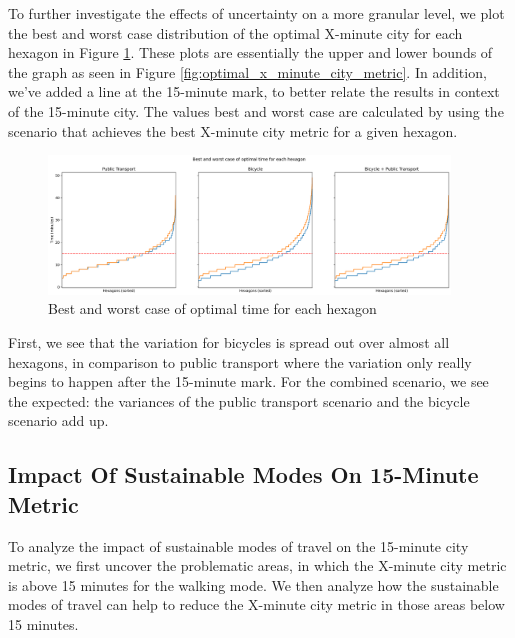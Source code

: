 To further investigate the effects of uncertainty on a more granular level, we plot the best and worst case distribution of the optimal X-minute city for each hexagon in Figure \ref{fig:best_and_worst_case_of_optimal_time_for_each_hexagon}.
These plots are essentially the upper and lower bounds of the graph as seen in Figure \ref{fig:optimal_x_minute_city_metric}.
In addition, we've added a line at the 15-minute mark, to better relate the results in context of the 15-minute city.
The values best and worst case are calculated by using the scenario that achieves the best X-minute city metric for a given hexagon.
\begin{figure}
  \begin{center}
    \includegraphics[width=0.95\textwidth]{Figures/results/uncertainty/optimal_best_worst_case}
  \end{center}
  \caption{Best and worst case of optimal time for each hexagon}
  \label{fig:best_and_worst_case_of_optimal_time_for_each_hexagon}
\end{figure}
First, we see that the variation for bicycles is spread out over almost all hexagons, in comparison to public transport where the variation only really begins to happen after the 15-minute mark.
For the combined scenario, we see the expected: the variances of the public transport scenario and the bicycle scenario add up.

\subsection{Impact Of Sustainable Modes On 15-Minute Metric}
\label{subsec:impact_of_sustainable_modes_on_15_minute_metric}

To analyze the impact of sustainable modes of travel on the 15-minute city metric, we first uncover the problematic areas, in which the X-minute city metric is above 15 minutes for the walking mode.
We then analyze how the sustainable modes of travel can help to reduce the X-minute city metric in those areas below 15 minutes.

